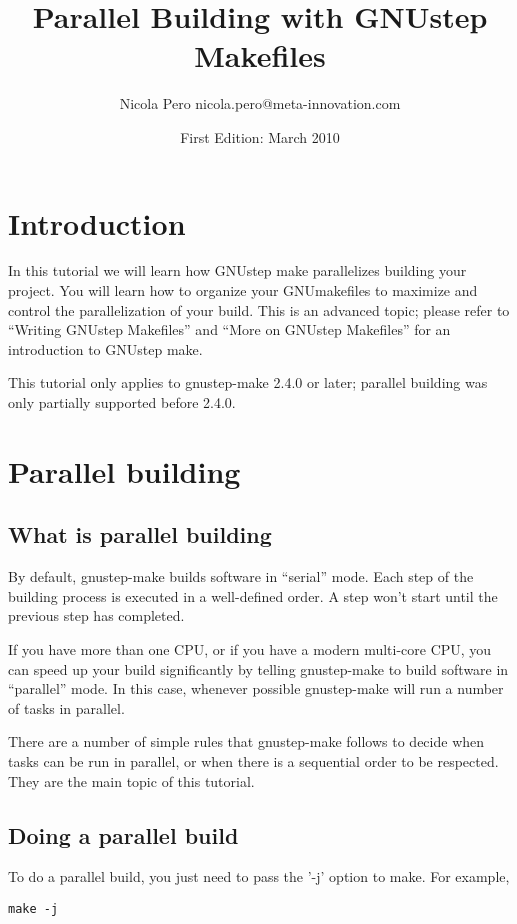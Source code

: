 \documentclass[a4paper]{article}
\begin{document}
\author{Nicola Pero nicola.pero@meta-innovation.com}
\title{Parallel Building with GNUstep Makefiles}
\date{First Edition: March 2010}
\maketitle

\section{Introduction}
In this tutorial we will learn how GNUstep make parallelizes building
your project.  You will learn how to organize your GNUmakefiles to
maximize and control the parallelization of your build.  This is an
advanced topic; please refer to ``Writing GNUstep Makefiles'' and
``More on GNUstep Makefiles'' for an introduction to GNUstep make.

This tutorial only applies to gnustep-make 2.4.0 or later; parallel
building was only partially supported before 2.4.0.

\section{Parallel building}

\subsection{What is parallel building}
By default, gnustep-make builds software in ``serial'' mode.  Each
step of the building process is executed in a well-defined order.  A
step won't start until the previous step has completed.

If you have more than one CPU, or if you have a modern multi-core CPU,
you can speed up your build significantly by telling gnustep-make to
build software in ``parallel'' mode.  In this case, whenever possible
gnustep-make will run a number of tasks in parallel.

There are a number of simple rules that gnustep-make follows to decide
when tasks can be run in parallel, or when there is a sequential order
to be respected.  They are the main topic of this tutorial.

\subsection{Doing a parallel build}
To do a parallel build, you just need to pass the '-j' option to make.
For example,

\begin{verbatim}
make -j
\end{verbatim}
\end{document}
